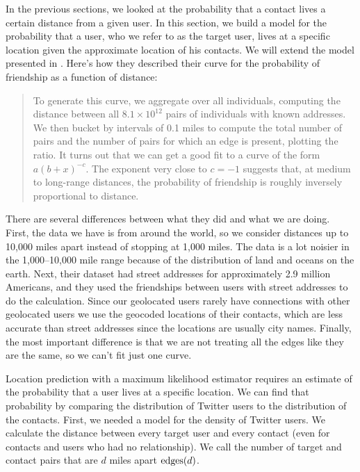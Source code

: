 In the previous sections, we looked at the probability that a contact lives a
certain distance from a given user.
%
In this section, we build a model for the probability that a user, who we refer
to as the target user, lives at a specific location given the approximate
location of his contacts.
%
We will extend the model presented in \cite{backstrom2010find}.
%
Here's how they described their curve for the probability of friendship as a
function of distance:
\begin{quote}
To generate this curve, we aggregate over all individuals, computing the
distance between all $8.1 \times 10^{12}$ pairs of individuals with known
addresses.
We then bucket by intervals of 0.1 miles to compute the total number of pairs
and the number of pairs for which an edge is present, plotting the ratio. It
turns out that we can get a good fit to a curve of the form $a(b+x)^{-c}$.
The exponent very close to $c=-1$ suggests that, at medium to long-range
distances, the probability of friendship is roughly inversely proportional to
distance.
\end{quote}

There are several differences between what they did and what we are doing.
%
First, the data we have is from around the world, so we consider distances up
to 10,000 miles apart instead of stopping at 1,000 miles.
%
The data is a lot noisier in the 1,000--10,000 mile range because of the
distribution of land and oceans on the earth.
%
Next, their dataset had street addresses for approximately 2.9 million
Americans, and they used the friendships between users with street addresses to
do the calculation.
%
Since our geolocated users rarely have connections with other geolocated users
we use the geocoded locations of their contacts, which are less accurate than
street addresses since the locations are usually city names.
%
Finally, the most important difference is that we are not treating all the
edges like they are the same, so we can't fit just one curve.

Location prediction with a maximum likelihood estimator requires an estimate of
the probability that a user lives at a specific location.
%
We can find that probability by comparing the distribution of Twitter users to
the distribution of the contacts.
%
First, we needed a model for the density of Twitter users.
%
We calculate the distance between every target user and every contact
(even for contacts and users who had no relationship).
%
We call the number of target and contact pairs that are $d$ miles apart
$\operatorname{edges}(d)$.

